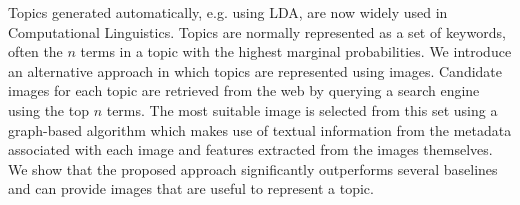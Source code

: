 Topics generated automatically, e.g. using LDA, are now widely used in Computational Linguistics. Topics are normally represented as a set of
 keywords, often the $n$ terms in a topic with the highest  marginal
 probabilities. We introduce an alternative approach in which topics are
 represented using images. Candidate images for each topic are retrieved from
 the web by querying a search engine using the top $n$ terms. The most suitable
 image is selected from this set using a graph-based algorithm which makes use
 of textual information from the metadata associated with each image and
 features extracted from the images themselves. We show that the proposed
 approach significantly outperforms several baselines and can provide images
 that are useful to represent a topic.

